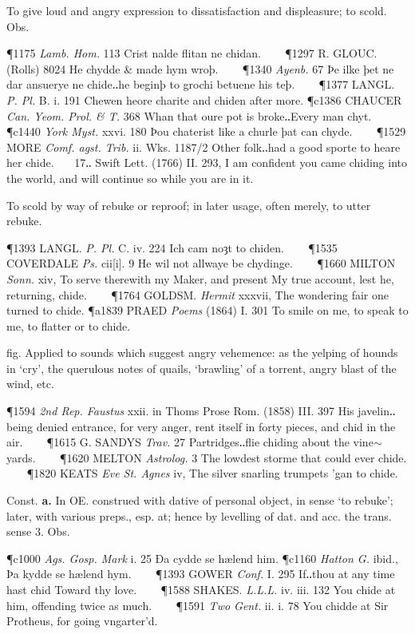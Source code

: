 \begin{description}[wide, labelwidth=!, labelindent=0pt]
\begin{myenumerate}
 To give loud and angry expression to dissatisfaction and displeasure; to scold. Obs.

\P 1175 \textit{Lamb.  Hom.} 113 Crist nalde flitan ne chidan.    
\P 1297 R. GLOUC.  (Rolls) 8024 He chydde \& made hym wroþ.    
\P 1340  \textit{Ayenb.} 67 Þe ilke þet ne dar ansuerye ne chide‥he beginþ to grochi betuene his teþ.    
\P 1377 LANGL.  \textit{P. Pl.} B. i. 191 Chewen heore charite and chiden after more.
\P c1386 CHAUCER  \textit{Can. Yeom. Prol. \& T.} 368 Whan that oure pot is broke‥Every man chyt.
\P c1440 \textit{York  Myst.} xxvi. 180 Þou chaterist like a churle þat can chyde.    
\P 1529 MORE  \textit{Comf. agst. Trib.} ii. Wks. 1187/2 Other folk‥had a good sporte to heare her chide.    17‥ Swift Lett. (1766) II. 293, I am confident you came chiding into the world, and will continue so while you are in it.

 To scold by way of rebuke or reproof; in later usage, often merely, to utter rebuke.

\P 1393 LANGL.  \textit{P. Pl.} C. iv. 224 Ich cam noȝt to chiden.    
\P 1535 COVERDALE  \textit{Ps.} cii[i]. 9 He wil not allwaye be chydinge.    
\P 1660 MILTON  \textit{Sonn.} xiv, To serve therewith my Maker, and present My true account, lest he, returning, chide.    
\P 1764 GOLDSM.  \textit{Hermit} xxxvii, The wondering fair one turned to chide.
\P a1839 PRAED  \textit{Poems} (1864) I. 301 To smile on me, to speak to me, to flatter or to chide.

 fig. Applied to sounds which suggest angry vehemence: as the yelping of hounds in ‘cry’, the querulous notes of quails, ‘brawling’ of a torrent, angry blast of the wind, etc.

\P 1594 \textit{2nd Rep. Faustus} xxii. in Thoms Prose Rom. (1858) III. 397 His javelin‥being denied entrance, for very anger, rent itself in forty pieces, and chid in the air.    
\P 1615 G. SANDYS  \textit{Trav.} 27 Partridges‥flie chiding about the vine$\sim$yards.    
\P 1620 MELTON  \textit{Astrolog.} 3 The lowdest storme that could ever chide.    
\P 1820 KEATS  \textit{Eve St. Agnes} iv, The silver snarling trumpets 'gan to chide.

 Const. \textbf{a.} In OE. construed with dative of personal object, in sense ‘to rebuke’; later, with various preps., esp. at; hence by levelling of dat. and acc. the trans. sense 3. Obs.

\P c1000 \textit{Ags. Gosp. Mark} i. 25 Ða cydde se hælend him.
\P c1160 \textit{Hatton  G.} ibid., Þa kydde se hælend hym.    
\P 1393 GOWER  \textit{Conf.} I. 295 If‥thou at any time hast chid Toward thy love.    
\P 1588 SHAKES.  \textit{L.L.L.} iv. iii. 132 You chide at him, offending twice as much.    
\P 1591 \textit{Two Gent.} ii. i. 78 You chidde at Sir Protheus, for going vngarter'd.


\end{myenumerate}
\end{description}
